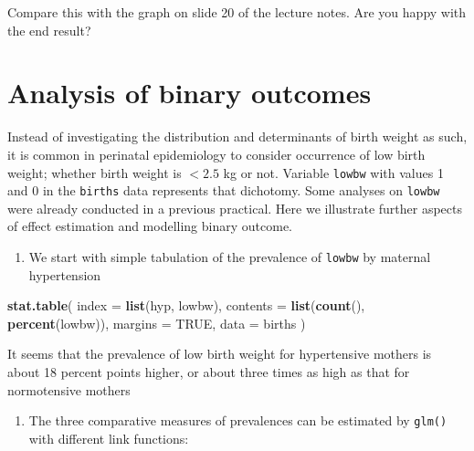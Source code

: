 \documentclass[
]{book}
\newenvironment{Shaded}{\begin{snugshade}}{\end{snugshade}}
\newcommand{\AttributeTok}[1]{\textcolor[rgb]{0.13,0.29,0.53}{#1}}
\newcommand{\ConstantTok}[1]{\textcolor[rgb]{0.56,0.35,0.01}{#1}}
\newcommand{\FunctionTok}[1]{\textcolor[rgb]{0.13,0.29,0.53}{\textbf{#1}}}
\newcommand{\NormalTok}[1]{#1}
\providecommand{\tightlist}{%
  \setlength{\itemsep}{0pt}\setlength{\parskip}{0pt}}
\begin{document}
Compare this with the graph on slide 20 of the lecture notes.
Are you happy with the end result?

\section{Analysis of binary outcomes}\label{analysis-of-binary-outcomes}

Instead of investigating the distribution and determinants
of birth weight as such, it is common in perinatal
epidemiology to consider
occurrence of low birth weight; whether birth weight is
\(< 2.5\) kg or not. Variable \texttt{lowbw} with values 1 and 0
in the \texttt{births} data represents that dichotomy.
Some analyses on \texttt{lowbw} were already conducted
in a previous practical. Here we illustrate further
aspects of effect estimation
and modelling binary outcome.

\begin{enumerate}
\def\labelenumi{\arabic{enumi}.}
\tightlist
\item
  We start with simple tabulation
  of the prevalence of \texttt{lowbw} by maternal hypertension
\end{enumerate}

\begin{Shaded}
\begin{Highlighting}[]
\FunctionTok{stat.table}\NormalTok{(}
  \AttributeTok{index =} \FunctionTok{list}\NormalTok{(hyp, lowbw),}
  \AttributeTok{contents =} \FunctionTok{list}\NormalTok{(}\FunctionTok{count}\NormalTok{(), }\FunctionTok{percent}\NormalTok{(lowbw)),}
  \AttributeTok{margins =} \ConstantTok{TRUE}\NormalTok{, }\AttributeTok{data =}\NormalTok{ births}
\NormalTok{)}
\end{Highlighting}
\end{Shaded}

It seems that the prevalence of low birth weight
for hypertensive mothers is about 18 percent points higher,
or about three times as high as that for normotensive mothers

\begin{enumerate}
\def\labelenumi{\arabic{enumi}.}
\setcounter{enumi}{1}
\tightlist
\item
  The three comparative measures of prevalences can be
  estimated by \texttt{glm()} with different link functions:
\end{enumerate}
\end{document}
